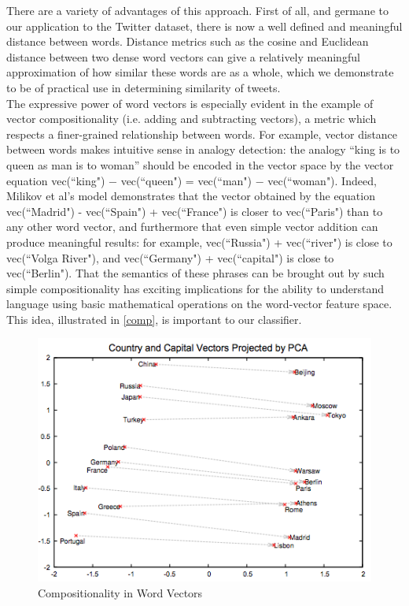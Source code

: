 \documentclass[conference]{IEEEtran}
\begin{document}
\indent There are a variety of advantages of this approach.  First of all, and germane to our application to the Twitter dataset, there is now a well defined and meaningful distance between words.  Distance metrics such as the cosine and Euclidean distance between two dense word vectors can give a relatively meaningful approximation of how similar these words are as a whole, which we demonstrate to be of practical use in determining similarity of tweets.\\

\indent The expressive power of word vectors is especially evident in the example of vector compositionality (i.e. adding and subtracting vectors), a metric which respects a finer-grained relationship between words. For example, vector distance between words makes intuitive sense in analogy detection: the analogy ``king is to queen as man is to woman” should be encoded in the vector space by the vector equation vec(``king") − vec(``queen") = vec(``man") − vec(``woman").  Indeed, Milikov et al's model demonstrates that the vector obtained by the equation vec(``Madrid") - vec(``Spain") + vec(``France") is closer to vec(``Paris") than to any other word vector, and furthermore that even simple vector addition can produce meaningful results: for example, vec(``Russia") + vec(``river") is close to vec(``Volga River"), and vec(``Germany") + vec(``capital") is close to vec(``Berlin"). That the semantics of these phrases can be brought out by such simple compositionality has exciting implications for the ability to understand language using basic mathematical operations on the word-vector feature space.  This idea, illustrated in \ref{comp}, is important to our classifier.\\

\begin{figure}
\label{comp}
	\centering
	\includegraphics[scale=0.5]{compositionality.png}
	\caption{Compositionality in Word Vectors}
	\label{fig1}
\end{figure}
\end{document}
